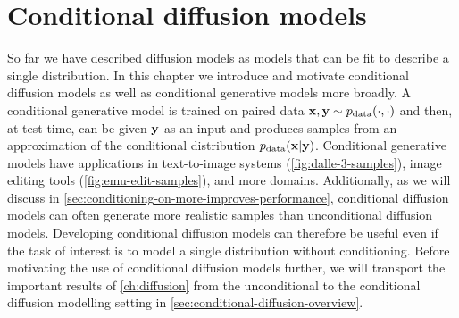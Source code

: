 \chapter{Conditional diffusion models} \label{ch:conditional-diffusion}

So far we have described diffusion models as models that can be fit to describe a single distribution. In this chapter we introduce and motivate conditional diffusion models as well as conditional generative models more broadly. A conditional generative model is trained on paired data ${\mathbf{x}}, {\mathbf{y}} \sim p_\text{data}(\cdot, \cdot)$ and then, at test-time, can be given ${\mathbf{y}}$ as an input and produces samples from an approximation of the conditional distribution $p_\text{data}({\mathbf{x}}|{\mathbf{y}})$. Conditional generative models have applications in text-to-image systems (\cref{fig:dalle-3-samples}), image editing tools (\cref{fig:emu-edit-samples}), and more domains. Additionally, as we will discuss in \cref{sec:conditioning-on-more-improves-performance}, conditional diffusion models can often generate more realistic samples than unconditional diffusion models. Developing conditional diffusion models can therefore be useful even if the task of interest is to model a single distribution without conditioning. Before motivating the use of conditional diffusion models further, we will transport the important results of \cref{ch:diffusion} from the unconditional to the conditional diffusion modelling setting in \cref{sec:conditional-diffusion-overview}.

